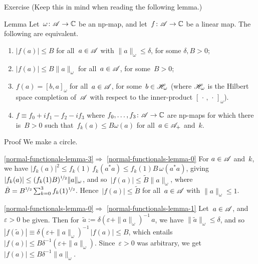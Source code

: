 \documentclass[a]{subfiles}
\begin{document}
\begin{parsec}
\begin{point}{Exercise}
(Keep this in mind when reading the following lemma.)
\end{point}
\begin{point}{Lemma}%
Let~$\omega\colon \mathscr{A}\to\mathbb{C}$ be an np-map,
and let~$f\colon \mathscr{A}\to \mathbb{C}$ be a linear map.
The following are equivalent.
\begin{enumerate}
\item\label{normal-functionals-lemma-0}
$\left|f(a)\right|\leq B$ for all~$a\in \mathscr{A}$
with $\|a\|_\omega\leq \delta$, for some $\delta,B>0$;
\item\label{normal-functionals-lemma-1}
$\left|f(a)\right| \leq B \|a\|_\omega$ for all~$a\in\mathscr{A}$,
for some~$B>0$;
\item\label{normal-functionals-lemma-2}
$f(a)=[b,a]_\omega$ for all~$a\in\mathscr{A}$, 
for some~$b\in\mathscr{H}_\omega$
(where $\mathscr{H}_\omega$ is the Hilbert space completion of~$\mathscr{A}$
with respect to the inner-product
$[\,\cdot\,,\,\cdot\,]_\omega$).
\item\label{normal-functionals-lemma-3}
$f\equiv f_0+if_1-f_2-if_3$
where $f_0,\dotsc,f_3\colon \mathscr{A}\to \mathbb{C}$
are np-maps for which there is~$B>0$
such that~$f_k(a)\leq B \omega(a)$ for all~$a\in\mathscr{A}_{+}$ 
and~$k$. 
\end{enumerate}
\begin{point}{Proof}%
We make a circle.
\begin{point}{%
\ref{normal-functionals-lemma-3}$\Longrightarrow$%
\ref{normal-functionals-lemma-0}}%
For $a\in \mathscr{A}$ and~$k$, we have
$\left|f_k(a)\right|^2 \leq
f_k(1)\,f_k(a^*a) \leq f_k(1)B \,\omega(a^*a)$,
giving~$\left|f_k(a)\right| \leq (f_k(1)B)^{\nicefrac{1}{2}} \|a\|_\omega$,
and so~$\left|f(a)\right|\leq \tilde{B} \|a\|_\omega$,
where $\tilde{B} = B^{\nicefrac{1}{2}}\sum_{k=0}^3f_k(1)^{\nicefrac{1}{2}}$.
Hence~$\left|f(a)\right|\leq \tilde{B}$
for all~$a\in\mathscr{A}$ with $\|a\|_\omega\leq 1$.
\end{point}
\begin{point}{\ref{normal-functionals-lemma-0}$\Longrightarrow$%
\ref{normal-functionals-lemma-1}}%
Let~$a\in\mathscr{A}$, and~$\varepsilon>0$ be given.
Then for~$\tilde{a}:=\delta(\varepsilon+\|a\|_\omega)^{-1}\,a$,
we have $\|\tilde{a}\|_\omega\leq \delta$,
and so~$\left|f(\tilde{a})\right|
\equiv \delta(\varepsilon +\|a\|_\omega)^{-1} \,\left|f(a)\right|
\leq B$,
which entails $\left|f(a)\right|\leq 
B\delta^{-1}(\varepsilon+\|a\|_\omega)$.
Since~$\varepsilon>0$ was arbitrary, we get~$\left|f(a)\right|\leq
B\delta^{-1}\|a\|_\omega$.
\end{point}

\end{point}
\end{point}
\end{parsec}
\end{document}
